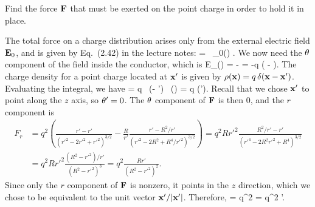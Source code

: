 \newcommand{\vEo}{\vE_0}
\newcommand{\del}{\delta}
\newcommand{\Etht}{E_\tht}
\newcommand{\Fr}{F_r}

\begin{problem}
	Find the force $\mathbf{F}$ that must be exerted on the point charge in order to hold it in place.
\end{problem}

\begin{solution}
	The total force on a charge distribution arises only from the external electric field $\vEo$, and is given by Eq.~(2.42) in the lecture notes:
	\beq
		\vF = \int \rhox \, \vEo(\vx) \dcx.
	\eeq
	We now need the $\theta$ component of the field inside the conductor, which is
	\beq
		\Etht(\vx) = - \pdv{\Gdxxp}{\tht}
		= -q \left(  -  \right).
	\eeq
	The charge density for a point charge located at $\mathbf{x}'$ is given by $\rho(\mathbf{x}) = q \, \delta(\mathbf{x} - \mathbf{x}')$.  Evaluating the integral, we have
	\beq
		\vF = \int q \, \delta(\vx - \vx') \, \vE(\vx) \dcx = q \vE(\vx').
	\eeq
	Recall that we chose $\mathbf{x}'$ to point along the $z$ axis, so $\theta' = 0$.  The $\theta$ component of $\mathbf{F}$ is then $0$, and the $r$ component is
	\begin{align*}
		\Fr &= q^2 \left( \frac{r' - r'}{({r'}^2 - 2 {r'}^2 + {r'}^2)^{3/2}} - \frac{R}{r'} \frac{r' - R^2 / r'}{({r'}^2 - 2 R^2 + R^4 / {r'}^2)^{3/2}} \right)
		= q^2 R {r'}^2 \frac{R^2 / r' - r'}{({r'}^4 - 2 R^2 {r'}^2 + R^4)^{3/2}} \\
		&= q^2 R {r'}^2 \frac{(R^2 - {r'}^2) / r'}{(R^2 - {r'}^2)^3}
		= q^2 \frac{R r'}{(R^2 - {r'}^2)^2}.
	\end{align*}
	Since only the $r$ component of $\mathbf{F}$ is nonzero, it points in the $z$ direction, which we chose to be equivalent to the unit vector $\mathbf{x}' / \abs{\mathbf{x}'}$.  Therefore,
	\beq
		\vF = q^2  
		= q^2  \vx'.
	\eeq
\end{solution}
